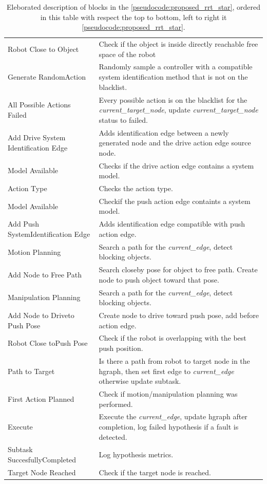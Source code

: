\begin{table}[H]
\begin{tabular}[t]{>{\raggedright}p{3.5cm}>{\raggedright\arraybackslash}p{10.5cm}}
Robot Close to Object& Check if the object is inside directly reachable free space of the robot \\
Generate Random\newline Action& Randomly sample a controller with a compatible system identification method that is not on the blacklist. \\
All Possible Actions Failed & Every possible action is on the blacklist for the \textit{current\_target\_node}, update \textit{current\_target\_node} status to failed.\\
Add Drive System Identification Edge & Adds identification edge between a newly generated node and the drive action edge source node. \\
Model Available& Checks if the drive action edge contains a system model. \\
Action Type& Checks the action type. \\
Model Available& Checkif the push action edge containts a system model. \\
Add Push System\newline Identification Edge& Adds identification edge compatible with push action edge. \\
Motion Planning& Search a path for the \textit{current\_edge}, detect blocking objects. \\
Add Node to Free Path & Search closeby pose for object to free path. Create node to push object toward that pose. \\
Manipulation Planning & Search a path for the \textit{current\_edge}, detect blocking objects.\\
Add Node to Drive\newline to Push Pose& Create node to drive toward push pose, add before action edge. \\
Robot Close to\newline Push Pose & Check if the robot is overlapping with the best push position. \\
Path to Target& Is there a path from robot to target node in the \ac{hgraph}, then set first edge to \textit{current\_edge} otherwise update subtask.\\
First Action Planned&  Check if motion/manipulation planning was performed. \\
Execute& Execute the \textit{current\_edge}, update \ac{hgraph} after completion, log failed hypothesis if a fault is detected. \\
Subtask Succesfully\newline Completed& Log hypothesis metrics. \\
Target Node Reached& Check if the target node is reached.\\
\end{tabular}
\caption{Eleborated description of blocks in the \cref{pseudocode:proposed_rrt_star}, ordered in this table with respect the top to bottom, left to right it \cref{pseudocode:proposed_rrt_star}.}%
\label{table:explainer_hgraph_figures_nodes}
\end{table}

